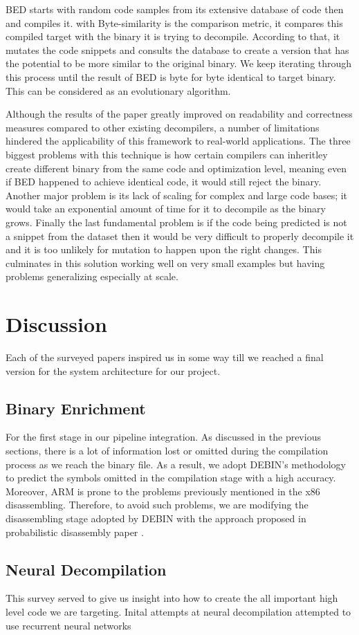 \documentclass[conference,a4paper]{IEEEtran}
\begin{document}
BED starts with random code samples from its extensive database of code then and compiles it.
with Byte-similarity is the comparison metric, it compares this compiled target with the binary it is trying to decompile.
According to that, it mutates the code snippets and consults the database to create a version that has the potential to be more similar to the original binary.
We keep iterating through this process until the result of BED is byte for byte identical to target binary.
This can be considered as an evolutionary algorithm.

Although the results of the paper greatly improved on readability and correctness measures compared to other existing decompilers, a number of limitations hindered the applicability of this framework to real-world applications.
The three biggest problems with this technique is how certain compilers can inheritley create different binary from the same code and optimization level, meaning even if BED happened to achieve identical code, it would still reject the binary.
Another major problem is its lack of scaling for complex and large code bases; it would take an exponential amount of time for it to decompile as the binary grows.
Finally the last fundamental problem is if the code being predicted is not a snippet from the dataset then it would be very difficult to properly decompile it and it is too unlikely for mutation to happen upon the right changes.
This culminates in this solution working well on very small examples but having problems generalizing especially at scale.

\section{Discussion}
Each of the surveyed papers inspired us in some way till we reached a final version for the system architecture for our project.

\subsection{Binary Enrichment}
For the first stage in our pipeline integration.
As discussed in the previous sections, there is a lot of information lost or omitted during the compilation process as we reach the binary file.
As a result, we adopt DEBIN's methodology to predict the symbols omitted in the compilation stage with a high accuracy.
Moreover, ARM is prone to the problems previously mentioned in the x86 disassembling.
Therefore, to avoid such problems, we are modifying the disassembling stage adopted by DEBIN with the approach proposed in probabilistic disassembly paper \cite{miller_probabilistic_2019}.

\subsection{Neural Decompilation}
This survey served to give us insight into how to create the all important high level code we are targeting.
Inital attempts at neural decompilation attempted to use recurrent neural networks 

\printbibliography
\end{document}
